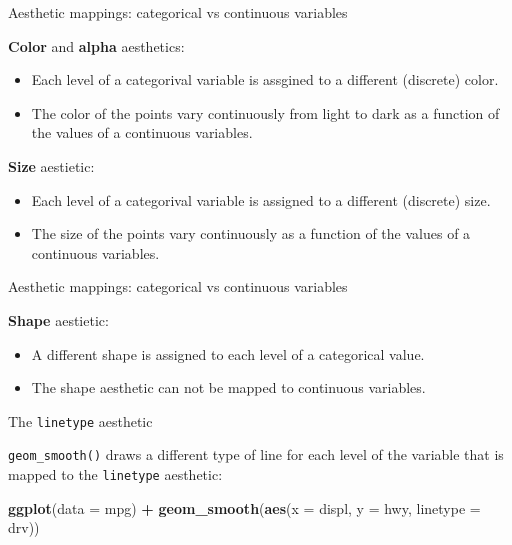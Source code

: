 \documentclass[ignorenonframetext,]{beamer}
\newenvironment{Shaded}{\begin{snugshade}}{\end{snugshade}}
\newcommand{\DataTypeTok}[1]{\textcolor[rgb]{0.13,0.29,0.53}{#1}}
\newcommand{\KeywordTok}[1]{\textcolor[rgb]{0.13,0.29,0.53}{\textbf{#1}}}
\newcommand{\NormalTok}[1]{#1}
\newcommand{\OperatorTok}[1]{\textcolor[rgb]{0.81,0.36,0.00}{\textbf{#1}}}
\newcommand{\StringTok}[1]{\textcolor[rgb]{0.31,0.60,0.02}{#1}}
\begin{document}
\begin{frame}{Aesthetic mappings: categorical vs continuous variables}
\protect\hypertarget{aesthetic-mappings-categorical-vs-continuous-variables}{}

\textbf{Color} and \textbf{alpha} aesthetics:

\begin{itemize}
\item
  Each level of a categorival variable is assgined to a different
  (discrete) color.
\item
  The color of the points vary continuously from light to dark as a
  function of the values of a continuous variables.
\end{itemize}

\textbf{Size} aestietic:

\begin{itemize}
\item
  Each level of a categorival variable is assigned to a different
  (discrete) size.
\item
  The size of the points vary continuously as a function of the values
  of a continuous variables.
\end{itemize}

\end{frame}

\begin{frame}{Aesthetic mappings: categorical vs continuous variables}
\protect\hypertarget{aesthetic-mappings-categorical-vs-continuous-variables-1}{}

\textbf{Shape} aestietic:

\begin{itemize}
\item
  A different shape is assigned to each level of a categorical value.
\item
  The shape aesthetic can not be mapped to continuous variables.
\end{itemize}

\end{frame}

\begin{frame}[fragile]{The \texttt{linetype} aesthetic}
\protect\hypertarget{the-linetype-aesthetic}{}

\texttt{geom\_smooth()} draws a different type of line for each level of
the variable that is mapped to the \texttt{linetype} aesthetic:

\begin{Shaded}
\begin{Highlighting}[]
\KeywordTok{ggplot}\NormalTok{(}\DataTypeTok{data =}\NormalTok{ mpg) }\OperatorTok{+}\StringTok{ }
\StringTok{  }\KeywordTok{geom_smooth}\NormalTok{(}\KeywordTok{aes}\NormalTok{(}\DataTypeTok{x =}\NormalTok{ displ, }\DataTypeTok{y =}\NormalTok{ hwy, }\DataTypeTok{linetype =}\NormalTok{ drv))}
\end{Highlighting}
\end{Shaded}

\end{frame}
\end{document}
